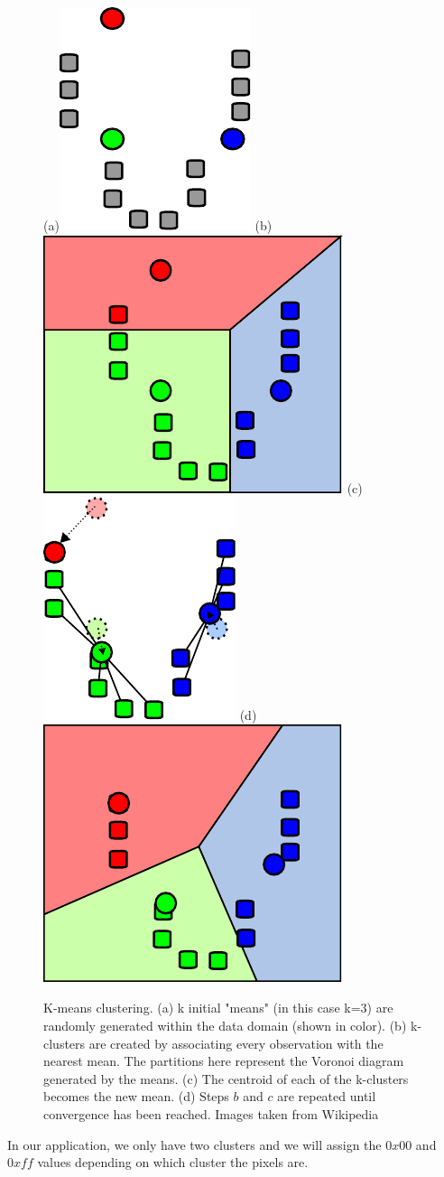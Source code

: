 \begin{figure}[htb] %
   \centering
   (a)\includegraphics[width=0.20\linewidth]{images/K_Means_Example_Step_1.pdf}\hfill
   (b)\includegraphics[width=0.20\linewidth]{images/K_Means_Example_Step_2.pdf}\hfill
   (c)\includegraphics[width=0.20\linewidth]{images/K_Means_Example_Step_3.pdf}\hfill
   (d)\includegraphics[width=0.20\linewidth]{images/K_Means_Example_Step_4.pdf}
   \caption[K-means clustering]{K-means clustering. (a) k initial "means" (in this case k=3) are randomly generated within the data domain (shown in color). (b) k-clusters are created by associating every observation with the nearest mean. The partitions here represent the Voronoi diagram generated by the means. (c) The centroid of each of the k-clusters becomes the new mean. (d) Steps $b$ and $c$ are repeated until convergence has been reached. Images taken from Wikipedia}
   \label{fig:kmeans}
\end{figure}

In our application, we only have two clusters and we will assign the $0x00$ and $0xff$ values depending on which cluster the pixels are.

